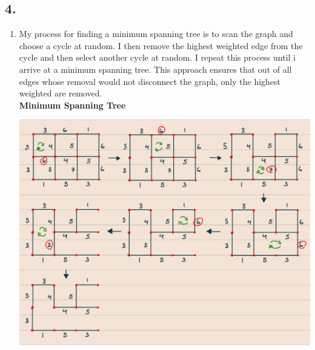\documentclass{article}
\begin{document}
    \vspace{1em}

    \subsection*{4.}
    \vspace*{10pt}
    \begin{enumerate}[label=(\alph*), left=10pt, itemsep=10pt]
        \item \begin{minipage}[t]{0.9\textwidth}
            My process for finding a minimum spanning tree is to scan the graph and choose a
            cycle at random. I then remove the highest weighted edge from the cycle and then
            select another cycle at random. I repeat this process until i arrive at a minimum
            spanning tree. This approach ensures that out of all edges whose removal would
            not disconnect the graph, only the highest weighted are removed.\\

            \textbf{Minimum Spanning Tree}\\
                \begin{minipage}[t]{0.9\textwidth}
                    \vspace{0.1em} %
                    \centering
                    \includegraphics[width=5.9in]{./4a.jpg} 
                \end{minipage}
        \end{minipage}


\end{enumerate}
\end{document}
